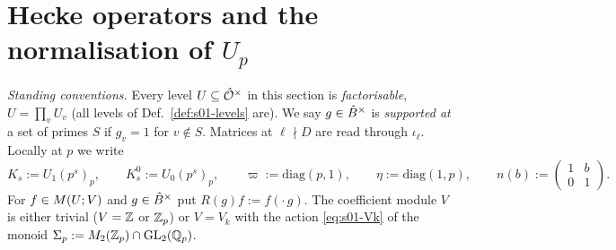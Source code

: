 \section{Hecke operators and the normalisation of $U_p$}

\emph{Standing conventions.} Every level $U\subseteq\hat{\mathcal{O}}^\times$ in this section is \emph{factorisable},
$U=\prod_vU_v$ (all levels of Def.~\ref{def:s01-levels} are). We say $g\in\hat{B}^\times$ is \emph{supported at} a set
of primes $S$ if $g_v=1$ for $v\notin S$. Matrices at $\ell\nmid D$ are read through $\iota_\ell$. Locally at $p$ we write
\[K_s:=U_1(p^s)_p,\qquad K^0_s:=U_0(p^s)_p,\qquad \varpi:=\mathrm{diag}(p,1),\qquad \eta:=\mathrm{diag}(1,p),\qquad
n(b):=\left(\begin{smallmatrix}1&b\\0&1\end{smallmatrix}\right).\]
For $f\in M(U;V)$ and $g\in\hat{B}^\times$ put $R(g)f:=f(\cdot\,g)$. The coefficient module $V$ is either trivial
($V=\mathbb{Z}$ or $\mathbb{Z}_p$) or $V=V_k$ with the action \eqref{eq:s01-Vk} of the monoid $\Sigma_p:=M_2(\mathbb{Z}_p)\cap\mathrm{GL}_2(\mathbb{Q}_p)$.

